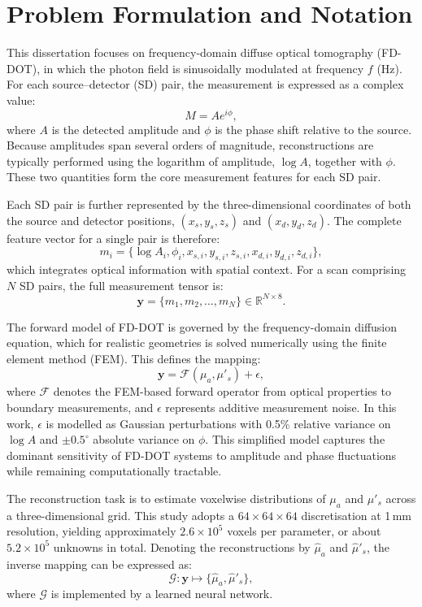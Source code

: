\section{Problem Formulation and Notation}
This dissertation focuses on frequency-domain diffuse optical tomography (FD-DOT), in which the photon field is sinusoidally modulated at frequency $f$ (Hz). For each source–detector (SD) pair, the measurement is expressed as a complex value:
\[
M = A e^{i\phi},
\]
where $A$ is the detected amplitude and $\phi$ is the phase shift relative to the source. Because amplitudes span several orders of magnitude, reconstructions are typically performed using the logarithm of amplitude, $\log A$, together with $\phi$. These two quantities form the core measurement features for each SD pair.

Each SD pair is further represented by the three-dimensional coordinates of both the source and detector positions, $(x_s, y_s, z_s)$ and $(x_d, y_d, z_d)$. The complete feature vector for a single pair is therefore:
\[
m_i = \{ \log A_i, \phi_i, x_{s,i}, y_{s,i}, z_{s,i}, x_{d,i}, y_{d,i}, z_{d,i} \},
\]
which integrates optical information with spatial context. For a scan comprising $N$ SD pairs, the full measurement tensor is:
\[
\mathbf{y} = \{ m_1, m_2, \dots, m_N \} \in \mathbb{R}^{N \times 8}.
\]

The forward model of FD-DOT is governed by the frequency-domain diffusion equation, which for realistic geometries is solved numerically using the finite element method (FEM). This defines the mapping:
\[
\mathbf{y} = \mathcal{F}(\mu_a, \mu'_s) + \epsilon,
\]
where $\mathcal{F}$ denotes the FEM-based forward operator from optical properties to boundary measurements, and $\epsilon$ represents additive measurement noise. In this work, $\epsilon$ is modelled as Gaussian perturbations with 0.5\% relative variance on $\log A$ and $\pm 0.5^\circ$ absolute variance on $\phi$. This simplified model captures the dominant sensitivity of FD-DOT systems to amplitude and phase fluctuations while remaining computationally tractable.

The reconstruction task is to estimate voxelwise distributions of $\mu_a$ and $\mu'_s$ across a three-dimensional grid. This study adopts a $64 \times 64 \times 64$ discretisation at 1\,mm resolution, yielding approximately $2.6 \times 10^5$ voxels per parameter, or about $5.2 \times 10^5$ unknowns in total. Denoting the reconstructions by $\hat{\mu}_a$ and $\hat{\mu}'_s$, the inverse mapping can be expressed as:
\[
\mathcal{G}: \mathbf{y} \mapsto \{ \hat{\mu}_a, \hat{\mu}'_s \},
\]
where $\mathcal{G}$ is implemented by a learned neural network.

